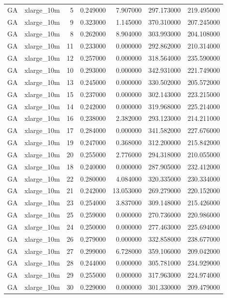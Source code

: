 \begin{tabular}{llrrrrr}
GA & xlarge_10m & 5 & 0.249000 & 7.907000 & 297.173000 & 219.495000 \\
GA & xlarge_10m & 9 & 0.323000 & 1.145000 & 370.310000 & 207.245000 \\
GA & xlarge_10m & 8 & 0.262000 & 8.904000 & 303.993000 & 204.108000 \\
GA & xlarge_10m & 11 & 0.233000 & 0.000000 & 292.862000 & 210.314000 \\
GA & xlarge_10m & 12 & 0.257000 & 0.000000 & 318.564000 & 235.590000 \\
GA & xlarge_10m & 10 & 0.293000 & 0.000000 & 342.931000 & 221.749000 \\
GA & xlarge_10m & 13 & 0.245000 & 0.000000 & 330.502000 & 205.572000 \\
GA & xlarge_10m & 15 & 0.237000 & 0.000000 & 302.143000 & 223.215000 \\
GA & xlarge_10m & 14 & 0.242000 & 0.000000 & 319.968000 & 225.214000 \\
GA & xlarge_10m & 16 & 0.238000 & 2.382000 & 293.123000 & 214.211000 \\
GA & xlarge_10m & 17 & 0.284000 & 0.000000 & 341.582000 & 227.676000 \\
GA & xlarge_10m & 19 & 0.247000 & 0.368000 & 312.200000 & 215.842000 \\
GA & xlarge_10m & 20 & 0.255000 & 2.776000 & 294.318000 & 210.055000 \\
GA & xlarge_10m & 18 & 0.240000 & 0.000000 & 287.905000 & 232.412000 \\
GA & xlarge_10m & 22 & 0.280000 & 4.084000 & 320.335000 & 230.334000 \\
GA & xlarge_10m & 21 & 0.242000 & 13.053000 & 269.279000 & 220.152000 \\
GA & xlarge_10m & 23 & 0.254000 & 3.837000 & 309.148000 & 215.426000 \\
GA & xlarge_10m & 25 & 0.259000 & 0.000000 & 270.736000 & 220.986000 \\
GA & xlarge_10m & 24 & 0.250000 & 0.000000 & 277.463000 & 225.694000 \\
GA & xlarge_10m & 26 & 0.279000 & 0.000000 & 332.858000 & 238.677000 \\
GA & xlarge_10m & 27 & 0.299000 & 6.728000 & 359.106000 & 209.042000 \\
GA & xlarge_10m & 28 & 0.244000 & 0.000000 & 305.781000 & 234.929000 \\
GA & xlarge_10m & 29 & 0.255000 & 0.000000 & 317.963000 & 224.974000 \\
GA & xlarge_10m & 30 & 0.229000 & 0.000000 & 301.330000 & 209.479000 \\

\end{tabular}
